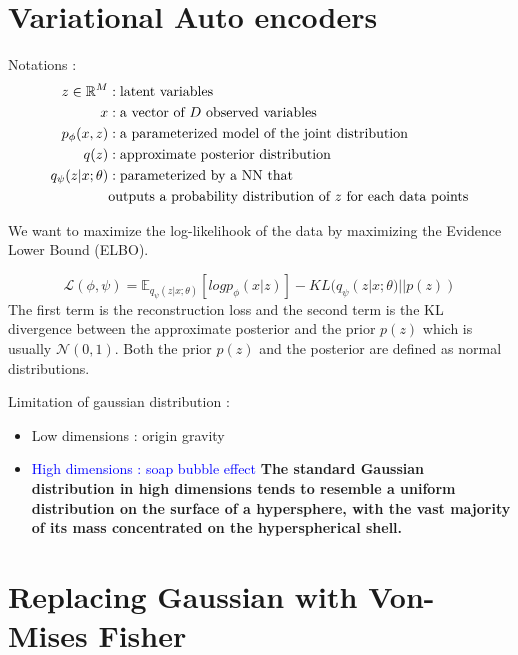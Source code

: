 \documentclass[12pt]{article}
\newcommand{\RR}{\mathbb{R}} %
\newcommand{\EE}{\mathbb{E}} %
\begin{document}
\section{Variational Auto encoders}

Notations :
\begin{align*}
    z\in\RR^M &: \textrm{latent variables} \\
    x &: \textmd{a vector of $D$ observed variables} \\
    p_\phi(x, z) &: \textrm{a parameterized model of the joint distribution}\\
    q(z) &: \textrm{approximate posterior distribution} \\
    q_\psi(z|x;\theta) &: \textrm{parameterized by a NN that}\\ 
    &\textrm{outputs a probability distribution of $z$ for each data points}
\end{align*}

We want to maximize the log-likelihook of the data by maximizing the Evidence Lower Bound (ELBO).

$$
\mathcal{L}(\phi, \psi) = \EE_{q_{\psi}(z|x; \theta)}[log p_{\phi}(x|z)] - KL(q_{\psi}(z|x;\theta) || p(z))
$$
The first term is the reconstruction loss and the second term is the KL divergence between the approximate posterior and the prior $p(z)$ which is usually $\mathcal{N}(0, 1)$.
Both the prior $p(z)$ and the posterior are defined as normal distributions.

Limitation of gaussian distribution :
\begin{itemize}
    \item Low dimensions : origin gravity
    \item \textcolor{blue}{High dimensions : soap bubble effect}
        \textbf{The standard Gaussian distribution in high dimensions tends to resemble a uniform distribution on the surface of a hypersphere, with the vast majority of its mass concentrated on the hyperspherical shell.}
\end{itemize}

\section{Replacing Gaussian with Von-Mises Fisher}
\end{document}
